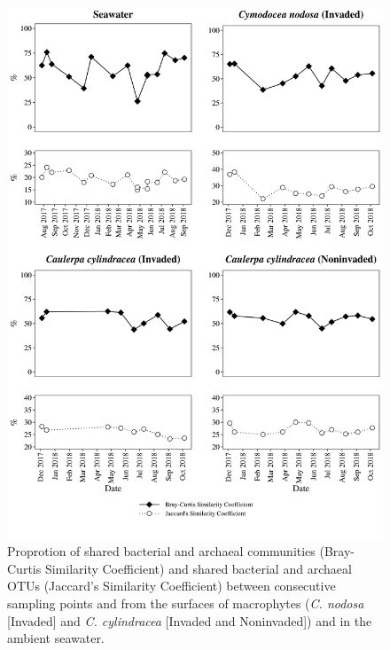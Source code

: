 \documentclass[12pt,]{article}
\begin{document}
\begin{figure}[H]

{\centering \includegraphics[width=0.85\linewidth]{../results/figures/seasonal_shared} 

}

\caption{Proprotion of shared bacterial and archaeal communities (Bray-Curtis Similarity Coefficient) and shared bacterial and archaeal OTUs (Jaccard's Similarity Coefficient) between consecutive sampling points and from the surfaces of macrophytes (\textit{C. nodosa} [Invaded] and \textit{C. cylindracea} [Invaded and Noninvaded]) and in the ambient seawater.\label{shared}}\label{fig:unnamed-chunk-2}
\end{figure}
\end{document}
